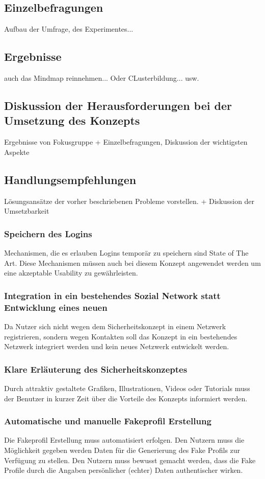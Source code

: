 \documentclass{sigchi}
\begin{document}
\subsection{Einzelbefragungen}
Aufbau der Umfrage, des Experimentes... 

\subsection{Ergebnisse}
auch das Mindmap reinnehmen... Oder CLusterbildung... usw.

\subsection{Diskussion der Herausforderungen bei der Umsetzung des Konzepts}
Ergebnisse von Fokusgruppe + Einzelbefragungen, Diskussion der wichtigsten Aspekte  
\subsection{Handlungsempfehlungen}
Lösungsansätze der vorher beschriebenen Probleme vorstellen. + Diskussion der Umsetzbarkeit
\subsubsection{Speichern des Logins}
Mechanismen, die es erlauben Logins temporär zu speichern sind State of The Art. Diese Mechanismen müssen auch bei diesem Konzept angewendet werden um eine akzeptable Usability zu gewährleisten.
\subsubsection{Integration in ein bestehendes Sozial Network statt Entwicklung eines neuen}
Da Nutzer sich nicht wegen dem Sicherheitskonzept in einem Netzwerk registrieren, sondern wegen Kontakten soll das Konzept in ein bestehendes Netzwerk integriert werden und kein neues Netzwerk entwickelt werden.
\subsubsection{Klare Erläuterung des Sicherheitskonzeptes}
Durch attraktiv gestaltete Grafiken, Illustrationen, Videos oder Tutorials muss der Benutzer in kurzer Zeit über die Vorteile des Konzepts informiert werden.
\subsubsection{Automatische und manuelle Fakeprofil Erstellung}
Die Fakeprofil Erstellung muss automatisiert erfolgen. Den Nutzern muss die Möglichkeit gegeben werden Daten für die Generierung des Fake Profils zur Verfügung zu stellen. Den Nutzern muss bewusst gemacht werden, dass die Fake Profile durch die Angaben persönlicher (echter) Daten authentischer wirken.
\end{document}
